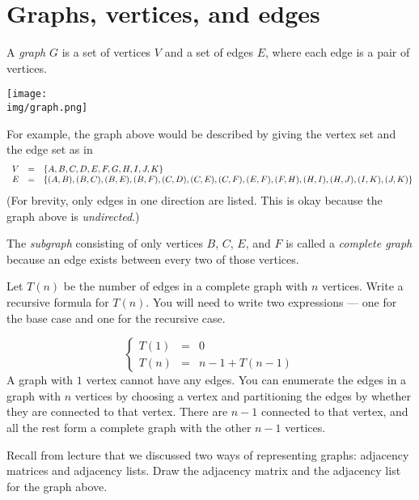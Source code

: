 \section*{Graphs, vertices, and edges%
}

A \emph{graph} $G$ is a set of vertices $V$ and a set of edges $E$,
where each edge is a pair of vertices.
\begin{center}
\texttt{[image: \\img/graph.png]}
\end{center}
For example, the graph above would be described by giving the vertex
set and the edge set as in
$$
\begin{array}{lcl@{}}
   V &=& \{A,B,C,D,E,F,G,H,I,J,K\}
\\ E &=& \{(A,B),(B,C),(B,E),(B,F),(C,D),(C,E),(C,F),(E,F),(F,H),(H,I),(H,J),(I,K),(J,K)\}
\end{array}
$$
(For brevity, only edges in one direction are listed. This is okay because the
graph above is \emph{undirected}.)

The \emph{subgraph} consisting of only vertices $B$, $C$, $E$, and
$F$ is called a \emph{complete graph} because an edge exists between
every two of those vertices.



Let $T(n)$ be the number of edges in a complete graph with $n$
vertices. Write a recursive formula for $T(n)$. You will need to write
two expressions --- one for the base case and one for the recursive
case.

\begin{solution}
$$
\left\{
\begin{array}{lll}
   T(1) &=& 0
\\ T(n) &=& n-1 + T(n-1)
\end{array}
\right.
$$
A graph with $1$ vertex cannot have any edges. You can enumerate the edges in a
graph with $n$ vertices by choosing a vertex and partitioning the edges by
whether they are connected to that vertex. There are $n-1$ connected to that
vertex, and all the rest form a complete graph with the other $n-1$ vertices.
\end{solution}



Recall from lecture that we discussed two ways of representing graphs:
adjacency matrices and adjacency lists. Draw the adjacency matrix and the
adjacency list for the graph above.


